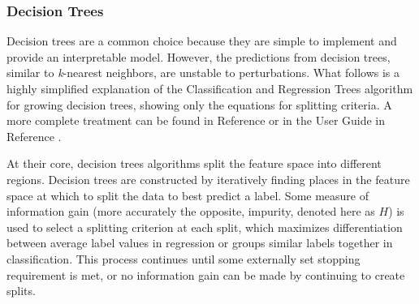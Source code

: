 \subsubsection{Decision Trees}

Decision trees are a common choice because they are simple to implement and
provide an interpretable model. However, the predictions from decision trees,
similar to \textit{k}-nearest neighbors, are unstable to perturbations.  What
follows is a highly simplified explanation of the Classification and Regression
Trees algorithm for growing decision trees, showing only the equations for
splitting criteria.  A more complete treatment can be found in Reference
\cite{elements_stats} or in the User Guide in Reference \cite{scikit}.

At their core, decision trees algorithms split the feature space into different
regions.  Decision trees are constructed by iteratively finding places in the
feature space at which to split the data to best predict a label. Some measure
of information gain (more accurately the opposite, impurity, denoted here as
$H$) is used to select a splitting criterion at each split, which maximizes
differentiation between average label values in regression or groups similar
labels together in classification.  This process continues until some
externally set stopping requirement is met, or no information gain can be made
by continuing to create splits. 

